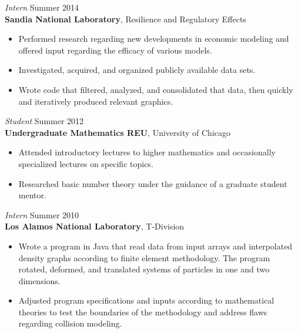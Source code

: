 \documentclass[margin, 10pt]{res} %
\begin{document}
\begin{resume}
{\sl Intern} \hfill Summer 2014 \\
\textbf{Sandia National Laboratory}, Resilience and Regulatory Effects

\begin{itemize} \itemsep -2pt
\item Performed research regarding new developments in economic modeling and offered input regarding the efficacy of various models. 
\item Investigated, acquired, and organized publicly available data sets. 
\item Wrote code that filtered, analyzed, and consolidated that data, then quickly and iteratively produced relevant graphics. 
\end{itemize}
 
{\sl Student} \hfill Summer 2012 \\
\textbf{Undergraduate Mathematics REU}, University of Chicago 
\begin{itemize} \itemsep -2pt
\item Attended introductory lectures to higher mathematics and occasionally specialized lectures on specific topics.
\item Researched basic number theory under the guidance of a graduate student mentor.  
\end{itemize} 

{\sl Intern} \hfill Summer 2010 \\
\textbf{Los Alamos National Laboratory}, T-Division
\begin{itemize} \itemsep -2pt
\item Wrote a program in Java that read data from input arrays and interpolated density graphs according to finite element methodology. The program rotated, deformed, and translated systems of particles in one and two dimensions.
\item Adjusted program specifications and inputs according to mathematical theories to test the boundaries of the methodology and address flaws regarding collision modeling. 
\end{itemize} 

 

\end{resume}
\end{document}
